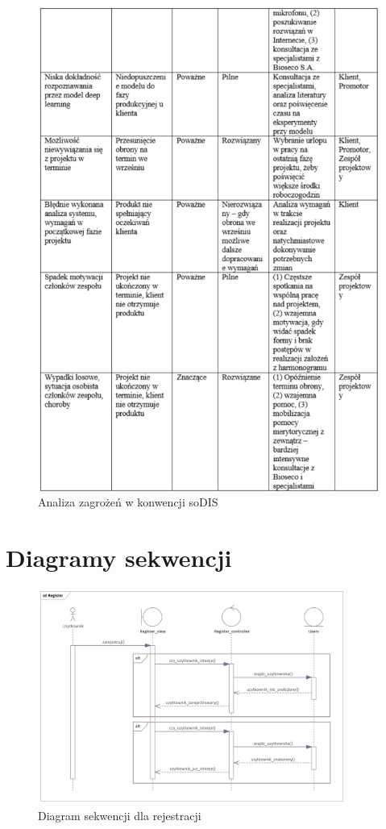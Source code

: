 \documentclass{sprz}
\begin{document}
\begin{figure}[h]
  \centering
  \includegraphics[width=1.0\textwidth]{sprz/sodis2.png}
  \caption{Analiza zagrożeń w konwencji soDIS}
  \label{img:sodis2}
\end{figure}

\clearpage

\section{Diagramy sekwencji}

\begin{figure}[h]
  \centering
  \includegraphics[width=0.9\textwidth]{sprz/sequence_register}
  \caption{Diagram sekwencji dla rejestracji}
  \label{img:sequence_register}
\end{figure}
\end{document}
